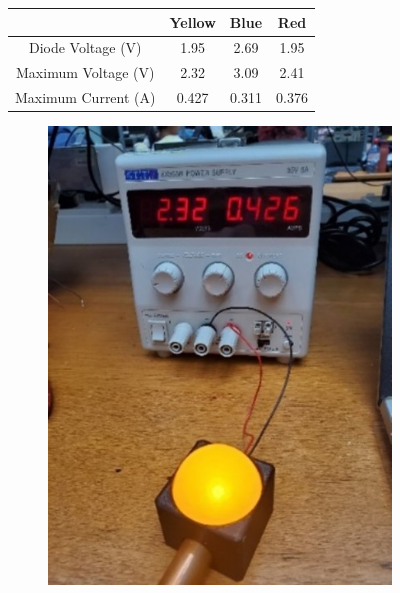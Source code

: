 \begin{figure}
    \centering
    \begin{tabular}{ |c|c|c|c|}
        \hline
                            & Yellow & Blue  & Red   \\
        \hline
        Diode Voltage (V)   & 1.95   & 2.69  & 1.95  \\
        \hline
        Maximum Voltage (V) & 2.32   & 3.09  & 2.41  \\
        \hline
        Maximum Current (A) & 0.427  & 0.311 & 0.376 \\
        \hline
    \end{tabular}
    \caption{}
    \label{tbl:led}
\end{figure}

\begin{figure}
    \centering
    \begin{subfigure}[b]{.3\linewidth}
        \includegraphics[width=\linewidth]{images/led-yellow.jpg}
    \end{subfigure}

\end{figure}

